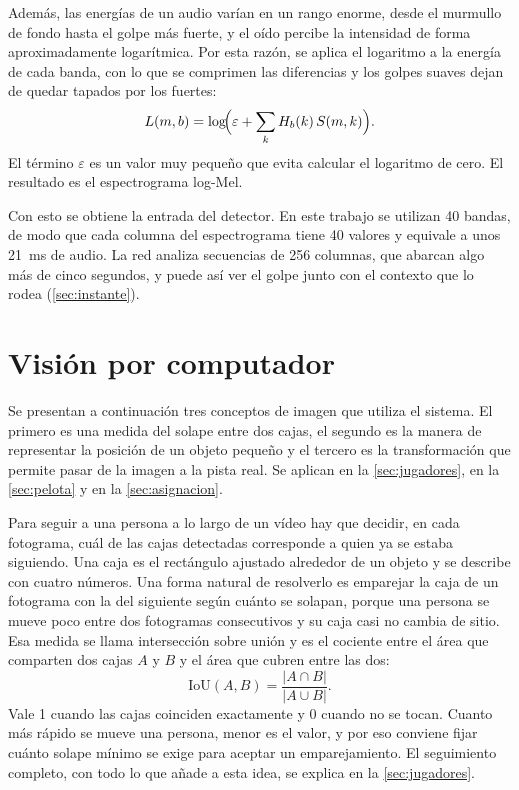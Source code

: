 Además, las energías de un audio varían en un rango enorme, desde el murmullo de fondo hasta el golpe más fuerte, y el oído percibe la intensidad de forma aproximadamente logarítmica.
Por esta razón, se aplica el logaritmo a la energía de cada banda, con lo que se comprimen las diferencias y los golpes suaves dejan de quedar tapados por los fuertes:
\begin{equation}
  L(m, b) = \log\!\Bigl( \varepsilon + \sum_{k} H_b(k)\, S(m, k) \Bigr).
  \label{eq:logmel}
\end{equation}
El término $\varepsilon$ es un valor muy pequeño que evita calcular el logaritmo de cero.
El resultado es el espectrograma log-Mel.

Con esto se obtiene la entrada del detector.
En este trabajo se utilizan 40 bandas, de modo que cada columna del espectrograma tiene 40 valores y equivale a unos 21~ms de audio.
La red analiza secuencias de 256 columnas, que abarcan algo más de cinco segundos, y puede así ver el golpe junto con el contexto que lo rodea (\cref{sec:instante}).

\section{Visión por computador}
\label{sec:fund-vision}

Se presentan a continuación tres conceptos de imagen que utiliza el sistema.
El primero es una medida del solape entre dos cajas, el segundo es la manera de representar la posición de un objeto pequeño y el tercero es la transformación que permite pasar de la imagen a la pista real.
Se aplican en la \cref{sec:jugadores}, en la \cref{sec:pelota} y en la \cref{sec:asignacion}.

Para seguir a una persona a lo largo de un vídeo hay que decidir, en cada fotograma, cuál de las cajas detectadas corresponde a quien ya se estaba siguiendo.
Una caja es el rectángulo ajustado alrededor de un objeto y se describe con cuatro números.
Una forma natural de resolverlo es emparejar la caja de un fotograma con la del siguiente según cuánto se solapan, porque una persona se mueve poco entre dos fotogramas consecutivos y su caja casi no cambia de sitio.
Esa medida se llama intersección sobre unión y es el cociente entre el área que comparten dos cajas $A$ y $B$ y el área que cubren entre las dos:
\begin{equation}
  \mathrm{IoU}(A, B) = \frac{|A \cap B|}{|A \cup B|}.
  \label{eq:iou}
\end{equation}
Vale 1 cuando las cajas coinciden exactamente y 0 cuando no se tocan.
Cuanto más rápido se mueve una persona, menor es el valor, y por eso conviene fijar cuánto solape mínimo se exige para aceptar un emparejamiento.
El seguimiento completo, con todo lo que añade a esta idea, se explica en la \cref{sec:jugadores}.

